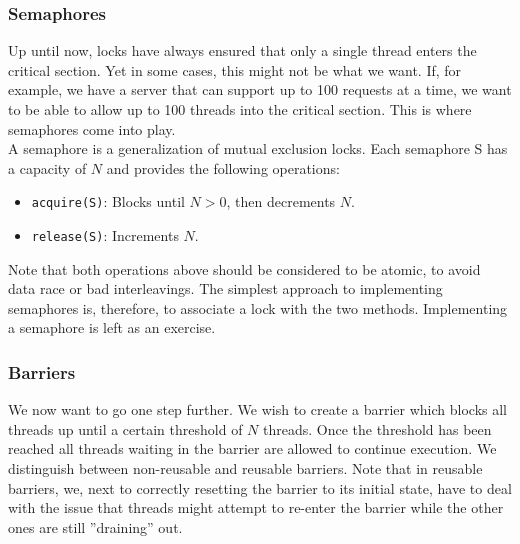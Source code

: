\documentclass[main]{subfiles}
\begin{document}

\subsubsection{Semaphores}
Up until now, locks have always ensured that only a single thread enters the critical section. Yet in some cases, this might not be what we want. If, for example, we have a server that can support up to 100 requests at a time, we want to be able to allow up to 100 threads into the critical section. This is where semaphores come into play.\\[3mm]
A semaphore is a generalization of mutual exclusion locks. Each semaphore S has a capacity of $N$ and provides the following operations:
\begin{itemize}
    \item \texttt{acquire(S)}: Blocks until $N > 0$, then decrements $N$.
    \item \texttt{release(S)}: Increments $N$.
\end{itemize}
Note that both operations above should be considered to be atomic, to avoid data race or bad interleavings. The simplest approach to implementing semaphores is, therefore, to associate a lock with the two methods. Implementing a semaphore is left as an exercise.


\subsubsection{Barriers}
We now want to go one step further. We wish to create a barrier which blocks all threads up until a certain threshold of $N$ threads. Once the threshold has been reached all threads waiting in the barrier are allowed to continue execution. We distinguish between non-reusable and reusable barriers. Note that in reusable barriers, we, next to correctly resetting the barrier to its initial state, have to deal with the issue that threads might attempt to re-enter the barrier while the other ones are still ''draining'' out.\\[3mm]

\newpage
\end{document}
